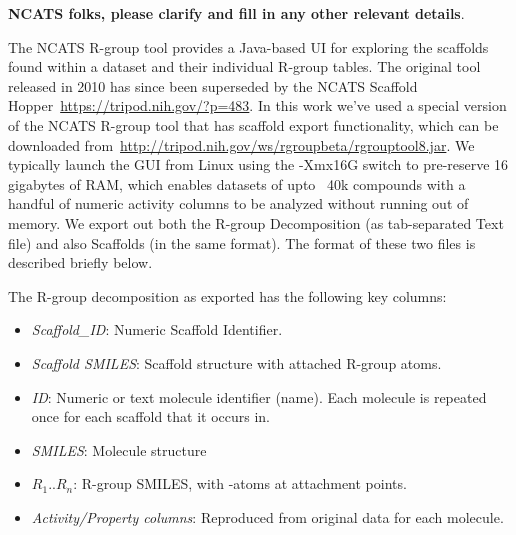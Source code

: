 \documentclass[journal=jacsat,manuscript=article]{achemso}
\begin{document}
\textbf{NCATS folks, please clarify and fill in any other relevant details}.

The NCATS R-group tool provides a Java-based UI for exploring the scaffolds found within a dataset and their individual R-group tables. The original tool released in 2010 has since been superseded by the NCATS Scaffold Hopper~\url{https://tripod.nih.gov/?p=483}.  In this work we've used a special version of the NCATS R-group tool that has scaffold export functionality, which can be downloaded from~\url{http://tripod.nih.gov/ws/rgroupbeta/rgrouptool8.jar}. We typically launch the GUI from Linux using the -Xmx16G switch to pre-reserve 16 gigabytes of RAM, which enables datasets of upto ~40k compounds with a handful of numeric activity columns to be analyzed without running out of memory. We export out both the R-group Decomposition (as tab-separated Text file) and also Scaffolds (in the same format). The format of these two files is described briefly below.

The R-group decomposition as exported has the following key columns:
\begin{itemize}
\item {\it Scaffold\_ID}: Numeric Scaffold Identifier.
\item {\it Scaffold SMILES}: Scaffold structure with attached R-group atoms.
\item {\it ID}: Numeric or text molecule identifier (name). Each molecule is repeated once for each scaffold that it occurs in.
\item {\it SMILES}: Molecule structure 
\item {\it $R_1..R_n$}: R-group SMILES, with \*-atoms at attachment points.
\item {\it Activity/Property columns}: Reproduced from original data for each molecule.
\end{itemize}
\end{document}
